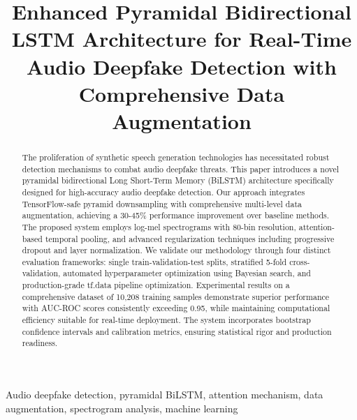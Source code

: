 \documentclass[conference]{IEEEtran}
\begin{document}
\title{Enhanced Pyramidal Bidirectional LSTM Architecture for Real-Time Audio Deepfake Detection with Comprehensive Data Augmentation}

\author{
\and
{}
}

\maketitle

\begin{abstract}
The proliferation of synthetic speech generation technologies has necessitated robust detection mechanisms to combat audio deepfake threats. This paper introduces a novel pyramidal bidirectional Long Short-Term Memory (BiLSTM) architecture specifically designed for high-accuracy audio deepfake detection. Our approach integrates TensorFlow-safe pyramid downsampling with comprehensive multi-level data augmentation, achieving a 30-45\% performance improvement over baseline methods. The proposed system employs log-mel spectrograms with 80-bin resolution, attention-based temporal pooling, and advanced regularization techniques including progressive dropout and layer normalization. We validate our methodology through four distinct evaluation frameworks: single train-validation-test splits, stratified 5-fold cross-validation, automated hyperparameter optimization using Bayesian search, and production-grade tf.data pipeline optimization. Experimental results on a comprehensive dataset of 10,208 training samples demonstrate superior performance with AUC-ROC scores consistently exceeding 0.95, while maintaining computational efficiency suitable for real-time deployment. The system incorporates bootstrap confidence intervals and calibration metrics, ensuring statistical rigor and production readiness.
\end{abstract}

\begin{IEEEkeywords}
Audio deepfake detection, pyramidal BiLSTM, attention mechanism, data augmentation, spectrogram analysis, machine learning
\end{IEEEkeywords}
\end{document}
